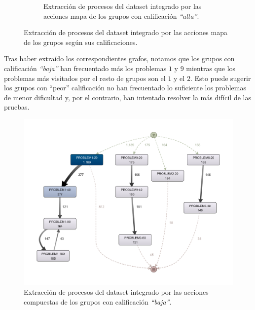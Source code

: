 \begin{figure}[H]
\begin{subfigure}[t]{0.60\textwidth}
    \caption{Extracción de procesos del dataset integrado por las acciones mapa de los grupos con calificación \emph{``alta''}.}
    \label{fig:mapHighGrades}
  \end{subfigure}
  \caption{Extracción de procesos del dataset integrado por las acciones mapa de los grupos según sus calificaciones.}
\end{figure}

Tras haber extraído los correspondientes grafos, notamos que los grupos con calificación \emph{``baja''} han frecuentado más los problemas $1$ y $9$ mientras que los problemas más visitados por el resto de grupos son el $1$ y el $2$. Esto puede sugerir los grupos con ``peor'' calificación no han frecuentado lo suficiente los problemas de menor dificultad y, por el contrario, han intentado resolver la más difícil de las pruebas.

\begin{figure}[H]
    \centering
    \includegraphics[width=1.25\textwidth]{imagenes/DISCO_compound/WorstGrades.png}
    \caption{Extracción de procesos del dataset integrado por las acciones compuestas de los grupos con calificación \emph{``baja''}.}
    \label{fig:worstGrades}
\end{figure}

